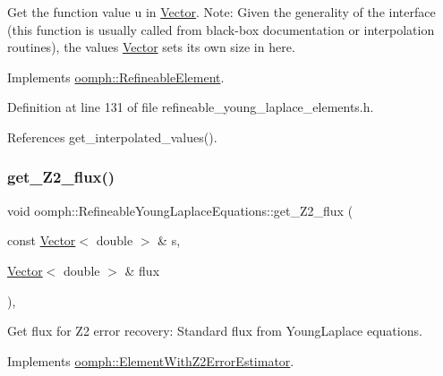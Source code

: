 Get the function value u in \hyperlink{classoomph_1_1Vector}{Vector}. Note\+: Given the generality of the interface (this function is usually called from black-\/box documentation or interpolation routines), the values \hyperlink{classoomph_1_1Vector}{Vector} sets its own size in here. 



Implements \hyperlink{classoomph_1_1RefineableElement_ada6f0efe831ffefb1d2829ce01d45bfc}{oomph\+::\+Refineable\+Element}.



Definition at line 131 of file refineable\+\_\+young\+\_\+laplace\+\_\+elements.\+h.



References get\+\_\+interpolated\+\_\+values().

\mbox{\label{classoomph_1_1RefineableYoungLaplaceEquations_ab8d8c6010331d8076a5d6369d331eb4d}} 
\subsubsection{\texorpdfstring{get\+\_\+\+Z2\+\_\+flux()}{get\_Z2\_flux()}}
{\footnotesize\ttfamily void oomph\+::\+Refineable\+Young\+Laplace\+Equations\+::get\+\_\+\+Z2\+\_\+flux (\begin{DoxyParamCaption}\item[{const \hyperlink{classoomph_1_1Vector}{Vector}$<$ double $>$ \&}]{s,  }\item[{\hyperlink{classoomph_1_1Vector}{Vector}$<$ double $>$ \&}]{flux }\end{DoxyParamCaption})\hspace{0.3cm}{\ttfamily [inline]}, {\ttfamily [virtual]}}



Get \textquotesingle{}flux\textquotesingle{} for Z2 error recovery\+: Standard flux from Young\+Laplace equations. 



Implements \hyperlink{classoomph_1_1ElementWithZ2ErrorEstimator_a5688ff5f546d81771cabad82ca5a7556}{oomph\+::\+Element\+With\+Z2\+Error\+Estimator}.



